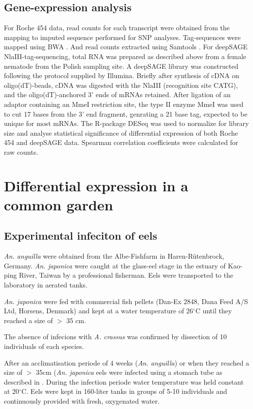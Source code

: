 \subsection*{Gene-expression analysis}

For Roche 454 data, read counts for each transcript were obtained from
the mapping to imputed sequence performed for SNP
analyses. Tag-sequences were mapped using BWA \cite{pmid19451168}. And
read counts extracted using Samtools
\cite{journals/bioinformatics/LiHWFRHMAD09}. For deepSAGE
NlaIII-tag-sequencing, total RNA was prepared as described above from
a female nematode from the Polish sampling site. A deepSAGE library
was constructed following the protocol supplied by Illumina. Briefly
after synthesis of cDNA on oligo(dT)-beads, cDNA was digested with the
NlaIII (recognition site CATG), and the oligo(dT)-anchored 3' ends of
mRNAs retained. After ligation of an adaptor containing an MmeI
restriction site, the type II enzyme MmeI was used to cut 17 bases
from the 3' end fragment, genrating a 21 base tag, expected to be
unique for most mRNAs. The R-package DESeq \cite{pmid20979621} was
used to normalize for library size and analyse statistical
significance of differential expression of both Roche 454 and deepSAGE
data. Spearman correlation coefficients were calculated for raw
counts.


\section{Differential expression in a common garden}

\subsection{Experimental infeciton of eels} 

\textit{An. anguilla} were obtained from the Albe-Fishfarm in
Haren-Rütenbrock, Germany. \textit{An. japonica} were caught at the
glass-eel stage in the estuary of Kao-ping River, Taiwan by a
professional fisherman. Eels were transported to the laboratory in
aerated tanks.

\textit{An. japonica} were fed with commercial fish pellets (Dan-Ex
2848, Dana Feed A/S Ltd, Horsens, Denmark) and kept at a water
temperature of 26$^{\circ}$C until they reached a size of $>$ 35 cm.

The absence of infecions with \textit{A. crassus} was confirmed by
dissection of 10 individuals of each species.

After an acclimatisation periode of 4 weeks (\textit{An. anguilla}) or
when they reached a size of $>$ 35cm (\textit{An. japonica} eels were
infected using a stomach tube as described in
\cite{boon1990effect}. During the infection periode water temperature
was held constant at 20$^{\circ}$C. Eels were kept in 160-liter tanks
in groups of 5-10 individuals and continuously provided with fresh,
oxygenated water.

